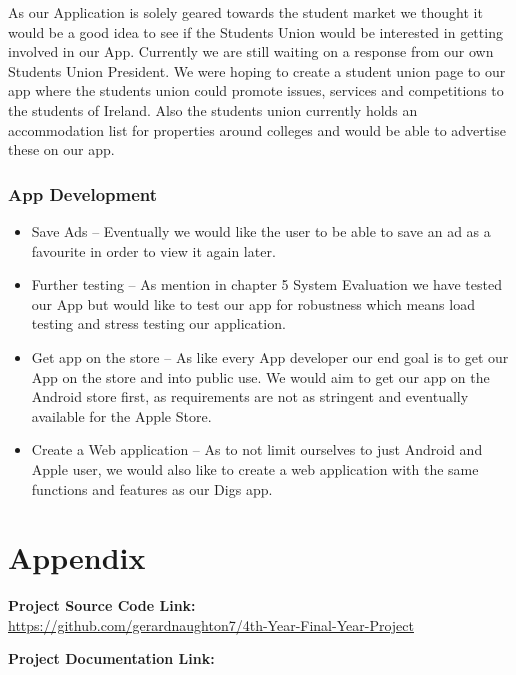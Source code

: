 As our Application is solely geared towards the student market we thought it would be a good idea to see if the Students Union would be interested in getting involved in our App. Currently we are still waiting on a response from our own Students Union President. We were hoping to create a student union page to our app where the students union could promote issues, services and competitions to the students of Ireland. Also the students union currently holds an accommodation list for properties around colleges and would be able to advertise these on our app. 

\subsection{App Development}

\begin{itemize}
    \item Save Ads – Eventually we would like the user to be able to save an ad as a favourite in order to view it again later.
    \item Further testing – As mention in chapter 5 System Evaluation we have tested our App but would like to test our app for robustness which means load testing and stress testing our application.
    \item Get app on the store – As like every App developer our end goal is to get our App on the store and into public use. We would aim to get our app on the Android store first, as requirements are not as stringent and eventually available for the Apple Store.
    \item Create a Web application – As to not limit ourselves to just Android and Apple user, we would also like to create a web application with the same functions and features as our Digs app.
\end{itemize}

\chapter{Appendix}

\textbf{Project Source Code Link:}\\ \href{https://github.com/gerardnaughton7/4th-Year-Final-Year-Project}{https://github.com/gerardnaughton7/4th-Year-Final-Year-Project}

\textbf{Project Documentation Link:}\\
\href{}{}
